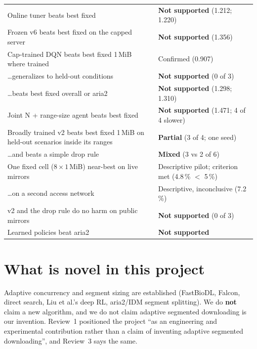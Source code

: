 {\begin{longtable}{@{}>{\raggedright\arraybackslash}p{11.6cm}>{\raggedright\arraybackslash}p{4.0cm}@{}}
Online tuner beats best fixed & \textbf{Not supported} (1.212; 1.220)\\
Frozen v6 beats best fixed on the capped server & \textbf{Not supported} (1.356)\\
Cap-trained DQN beats best fixed 1\,MiB where trained & Confirmed (0.907)\\
\dots generalizes to held-out conditions & \textbf{Not supported} (0 of 3)\\
\dots beats best fixed overall or aria2 & \textbf{Not supported} (1.298; 1.310)\\
Joint N + range-size agent beats best fixed & \textbf{Not supported} (1.471; 4 of 4 slower)\\
Broadly trained v2 beats best fixed 1\,MiB on held-out scenarios inside its ranges & \textbf{Partial} (3 of 4; one seed)\\
\dots and beats a simple drop rule & \textbf{Mixed} (3 vs 2 of 6)\\
One fixed cell ($8\times1$\,MiB) near-best on live mirrors & Descriptive pilot; criterion met (4.8\,\% $<$ 5\,\%)\\
\dots on a second access network & Descriptive, inconclusive (7.2\,\%)\\
v2 and the drop rule do no harm on public mirrors & \textbf{Not supported} (0 of 3)\\
Learned policies beat aria2 & \textbf{Not supported}\\
\bottomrule
\end{longtable}
}

\section{What is novel in this project}\label{sec:novelty}
\begin{careful}
Adaptive concurrency and segment sizing are established (FastBioDL, Falcon, direct search, Liu et al.'s deep RL, aria2/IDM segment splitting). We do \textbf{not} claim a new algorithm, and we do not claim adaptive segmented downloading is our invention. Review~1 positioned the project ``as an engineering and experimental contribution rather than a claim of inventing adaptive segmented downloading'', and Review~3 says the same.
\end{careful}

